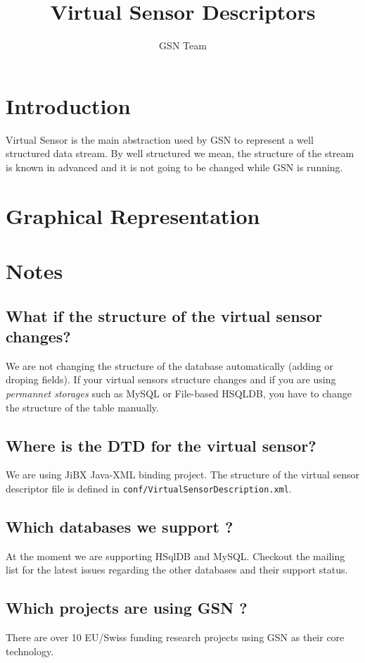 \documentclass[10pt]{article}
\title{Virtual Sensor Descriptors}
\author{GSN Team}
\begin{document}
\maketitle
\section{Introduction}
Virtual Sensor is the main abstraction used by GSN to represent a well structured data stream.
By well structured we mean, the structure of the stream is known in advanced and it is not going to be changed
while GSN is running.
\section{Graphical Representation}
\section{}

\section{Notes}
\subsection{What if the structure of the virtual sensor changes?}
We are not changing the structure of the database automatically (adding or droping fields). If your virtual sensors structure
changes and if you are using \emph{permannet storages} such as MySQL or File-based HSQLDB, you have to change the structure of the
table manually. 
\subsection{Where is the DTD for the virtual sensor?}
We are using JiBX Java-XML binding project. The structure of the virtual sensor descriptor file is defined in \texttt{conf/VirtualSensorDescription.xml}.
\subsection{Which databases we support ?}
At the moment we are supporting HSqlDB and MySQL. Checkout the mailing list for the latest issues regarding the other databases and their
support status.
\subsection{Which projects are using GSN ?}
There are over 10 EU/Swiss funding research projects using GSN as their core technology.
\end{document}
